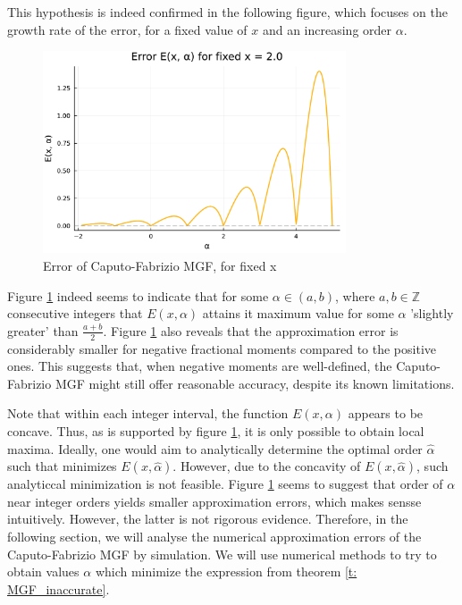 This hypothesis is indeed confirmed in the following figure, which focuses on the growth rate of the error, for a fixed value of \(x\) and an increasing order \(\alpha\).

\begin{figure}[H]
    \centering
    \includegraphics[width=0.8\textwidth]{figures/error_plot_fixed_x.pdf}
    \caption{Error of Caputo-Fabrizio MGF, for fixed x}
    \label{fig:error_MGF_fixed_x}
\end{figure}
Figure \ref{fig:error_MGF_fixed_x} indeed seems to indicate that for some \(\alpha \in (a, b)\), where \(a, b \in \mathbb{Z}\) consecutive integers that \(E(x, \alpha)\) attains it maximum value for some \(\alpha\) 'slightly greater' than \(\frac{a + b}{2}\). Figure \ref{fig:error_MGF_fixed_x} also reveals that the approximation error is considerably smaller for negative fractional moments compared to the positive ones. This suggests that, when negative moments are well-defined, the Caputo-Fabrizio MGF might still offer reasonable accuracy, despite its known limitations.

Note that within each integer interval, the function \(E(x, \alpha)\) appears to be concave. Thus, as is supported by figure \ref{fig:error_MGF_fixed_x}, it is only possible to obtain local maxima. Ideally, one would aim to analytically determine the optimal order \(\hat{\alpha}\) such that minimizes \(E(x, \hat{\alpha})\). However, due to the concavity of \(E(x, \hat{\alpha})\), such analyticcal minimization is not feasible. Figure \ref{fig:error_MGF_fixed_x} seems to suggest that order of \(\alpha\) near integer orders yields smaller approximation errors, which makes sensse intuitively. However, the latter is not rigorous evidence. Therefore, in the following section, we will analyse the numerical approximation errors of the Caputo-Fabrizio MGF by simulation. We will use numerical methods to try to obtain values \(\alpha\) which minimize the expression from theorem \ref{t: MGF_inaccurate}.
